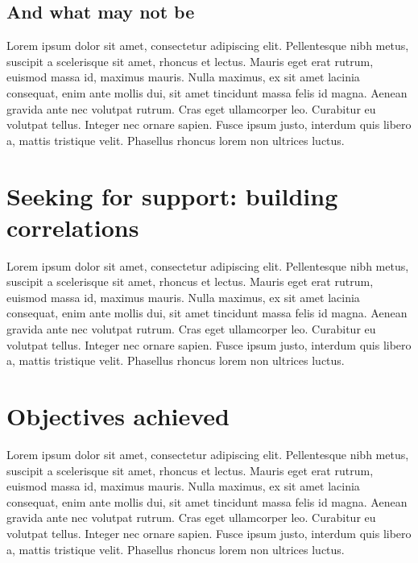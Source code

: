 \subsection{And what may not be}\label{sub:notworthwhile}
Lorem ipsum dolor sit amet, consectetur adipiscing elit. Pellentesque nibh metus, suscipit a scelerisque sit amet, rhoncus et lectus. Mauris eget erat rutrum, euismod massa id, maximus mauris. Nulla maximus, ex sit amet lacinia consequat, enim ante mollis dui, sit amet tincidunt massa felis id magna. Aenean gravida ante nec volutpat rutrum. Cras eget ullamcorper leo. Curabitur eu volutpat tellus. Integer nec ornare sapien. Fusce ipsum justo, interdum quis libero a, mattis tristique velit. Phasellus rhoncus lorem non ultrices luctus.

\section{Seeking for support: building correlations}\label{sec:seekingforsupport}
Lorem ipsum dolor sit amet, consectetur adipiscing elit. Pellentesque nibh metus, suscipit a scelerisque sit amet, rhoncus et lectus. Mauris eget erat rutrum, euismod massa id, maximus mauris. Nulla maximus, ex sit amet lacinia consequat, enim ante mollis dui, sit amet tincidunt massa felis id magna. Aenean gravida ante nec volutpat rutrum. Cras eget ullamcorper leo. Curabitur eu volutpat tellus. Integer nec ornare sapien. Fusce ipsum justo, interdum quis libero a, mattis tristique velit. Phasellus rhoncus lorem non ultrices luctus.

\section{Objectives achieved}\label{secd:objectivesachieved}
Lorem ipsum dolor sit amet, consectetur adipiscing elit. Pellentesque nibh metus, suscipit a scelerisque sit amet, rhoncus et lectus. Mauris eget erat rutrum, euismod massa id, maximus mauris. Nulla maximus, ex sit amet lacinia consequat, enim ante mollis dui, sit amet tincidunt massa felis id magna. Aenean gravida ante nec volutpat rutrum. Cras eget ullamcorper leo. Curabitur eu volutpat tellus. Integer nec ornare sapien. Fusce ipsum justo, interdum quis libero a, mattis tristique velit. Phasellus rhoncus lorem non ultrices luctus.


